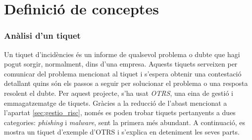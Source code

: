 \section{Definició de conceptes}
\subsubsection{Anàlisi d'un tiquet}
Un tiquet d'incidències és un informe de qualsevol problema o dubte que hagi pogut sorgir, normalment, dins d'una empresa. Aquests tiquets serveixen per comunicar del problema mencionat al tiquet i s'espera obtenir una contestació detallant quins són els passos a seguir per solucionar el problema o una resposta resolent el dubte. Per aquest projecte, s'ha usat \textit{OTRS}, una eina de gestió i emmagatzematge de tiquets. Gràcies a la reducció de l'abast mencionat a l'apartat \ref{sec:gestio_risc}, només es poden trobar tiquets pertanyents a dues categories: \textit{phishing} i \textit{malware}, sent la primera més abundant. A continuació, es mostra un tiquet d'exemple d'OTRS i s'explica en deteniment les seves parts.

